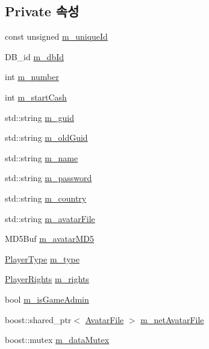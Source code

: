 \subsection*{Private 속성}
\begin{DoxyCompactItemize}
\item 
const unsigned \hyperlink{class_player_data_a2b6ed5c114b242c39eab3ec7c6622a5f}{m\-\_\-unique\-Id}
\item 
D\-B\-\_\-id \hyperlink{class_player_data_af4a330231d9309b6e703f4c4fda251a8}{m\-\_\-db\-Id}
\item 
int \hyperlink{class_player_data_a00807837606a10faee2849b979181402}{m\-\_\-number}
\item 
int \hyperlink{class_player_data_afb53d1b4126139cdc74b8322dab0094a}{m\-\_\-start\-Cash}
\item 
std\-::string \hyperlink{class_player_data_a3d3abd9ce7a8421596ce2ec2bf16bd64}{m\-\_\-guid}
\item 
std\-::string \hyperlink{class_player_data_aac3ac77674157db291a3f49076bcb4bc}{m\-\_\-old\-Guid}
\item 
std\-::string \hyperlink{class_player_data_a0174f971f59af5008301ac6eb3d2304c}{m\-\_\-name}
\item 
std\-::string \hyperlink{class_player_data_a2cbffcef76225936b3860adcd0ab6e03}{m\-\_\-password}
\item 
std\-::string \hyperlink{class_player_data_af349fdb550aaac72ccaead9a156be844}{m\-\_\-country}
\item 
std\-::string \hyperlink{class_player_data_aa3342ab34d521ab87edd40ec7622be56}{m\-\_\-avatar\-File}
\item 
M\-D5\-Buf \hyperlink{class_player_data_a5a6b19ae010990245ed6214be517f2cf}{m\-\_\-avatar\-M\-D5}
\item 
\hyperlink{playerdata_8h_abe590f3c9109f404f003d5d7e4f0fccf}{Player\-Type} \hyperlink{class_player_data_a3e4b8d9fcda3d2def5f0a79468a87903}{m\-\_\-type}
\item 
\hyperlink{playerdata_8h_ac0c72aca5c5ceabb2abbcd2d2c02aba6}{Player\-Rights} \hyperlink{class_player_data_aa764ce6a7e503e938865f52463c48d63}{m\-\_\-rights}
\item 
bool \hyperlink{class_player_data_ad7c207bf8ecc38e2f86bdd8d83c935df}{m\-\_\-is\-Game\-Admin}
\item 
boost\-::shared\-\_\-ptr$<$ \hyperlink{struct_avatar_file}{Avatar\-File} $>$ \hyperlink{class_player_data_afafb202de188ebee15e54b49aa96feac}{m\-\_\-net\-Avatar\-File}
\item 
boost\-::mutex \hyperlink{class_player_data_a8e1276aab88bec3fa48e3c59f193827e}{m\-\_\-data\-Mutex}
\end{DoxyCompactItemize}


